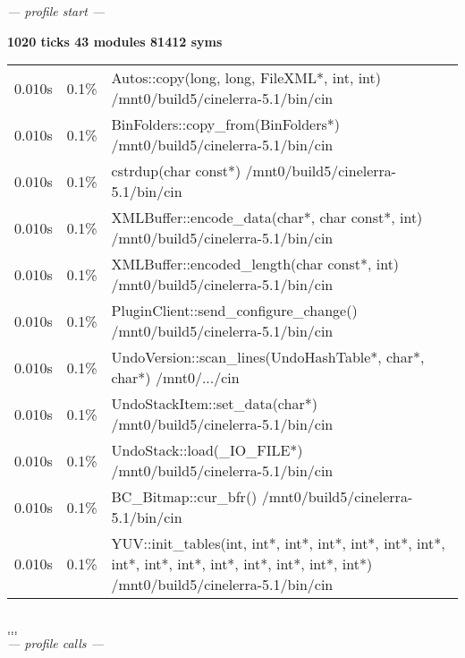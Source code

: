 \textit{--- profile start ---}

\textbf{1020 ticks 43 modules 81412 syms}\\
\begin{tabular}{@{}rrp{\linewidth-6em}}
 0.010s & 0.1\% & Autos::copy(long, long, FileXML*, int, int) /mnt0/build5/cinelerra-5.1/bin/cin\\
 0.010s & 0.1\% & BinFolders::copy\_from(BinFolders*) /mnt0/build5/cinelerra-5.1/bin/cin\\
 0.010s & 0.1\% & cstrdup(char const*)     /mnt0/build5/cinelerra-5.1/bin/cin\\
 0.010s & 0.1\% & XMLBuffer::encode\_data(char*, char const*, int) /mnt0/build5/cinelerra-5.1/bin/cin\\
 0.010s & 0.1\% & XMLBuffer::encoded\_length(char const*, int) /mnt0/build5/cinelerra-5.1/bin/cin\\
 0.010s & 0.1\% & PluginClient::send\_configure\_change() /mnt0/build5/cinelerra-5.1/bin/cin\\
 0.010s & 0.1\% & UndoVersion::scan\_lines(UndoHashTable*, char*, char*) /mnt0/.../cin\\
 0.010s & 0.1\% & UndoStackItem::set\_data(char*) /mnt0/build5/cinelerra-5.1/bin/cin\\
 0.010s & 0.1\% & UndoStack::load(\_IO\_FILE*) /mnt0/build5/cinelerra-5.1/bin/cin\\
 0.010s & 0.1\% & BC\_Bitmap::cur\_bfr()     /mnt0/build5/cinelerra-5.1/bin/cin\\
 0.010s & 0.1\% & YUV::init\_tables(int, int*, int*, int*, int*, int*, int*, int*, int*, int*, int*, int*, int*, int*, int*) /mnt0/build5/cinelerra-5.1/bin/cin\\
\end{tabular}\\
$\dots$\\
$\dots$\\
\textit{--- profile calls ---}

